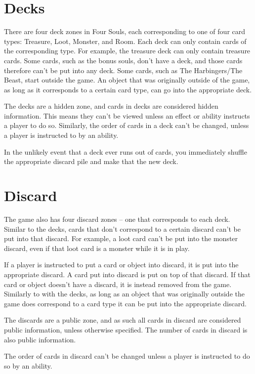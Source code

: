 \documentclass[
  fontsize=10pt,
  paper=a5,
  version=last,
  chapterprefix=true,
  bindingoffset=5mm,
  ]{scrbook}
\begin{document}
    \section{Decks}
    There are four deck zones in Four Souls, each corresponding to one of four card types: Treasure, Loot, Monster, and Room. Each deck can only contain cards of the corresponding type. For example, the treasure deck can only contain treasure cards. Some cards, such as the bonus souls, don’t have a deck, and those cards therefore can’t be put into any deck. Some cards, such as The Harbingers/The Beast, start outside the game. An object that was originally outside of the game, as long as it corresponds to a certain card type, can go into the appropriate deck.

    The decks are a hidden zone, and cards in decks are considered hidden information. This means they can’t be viewed unless an effect or ability instructs a player to do so. Similarly, the order of cards in a deck can’t be changed, unless a player is instructed to by an ability.

    In the unlikely event that a deck ever runs out of cards, you immediately shuffle the appropriate discard pile and make that the new deck.

    \section{Discard}
    The game also has four discard zones – one that corresponds to each deck. Similar to the decks, cards that don’t correspond to a certain discard can’t be put into that discard. For example, a loot card can’t be put into the monster discard, even if that loot card is a monster while it is in play.

    If a player is instructed to put a card or object into discard, it is put into the appropriate discard. A card put into discard is put on top of that discard. If that card or object doesn’t have a discard, it is instead removed from the game. Similarly to with the decks, as long as an object that was originally outside the game does correspond to a card type it can be put into the appropriate discard.

    The discards are a public zone, and as such all cards in discard are considered public information, unless otherwise specified. The number of cards in discard is also public information.

    The order of cards in discard can’t be changed unless a player is instructed to do so by an ability.
\end{document}
